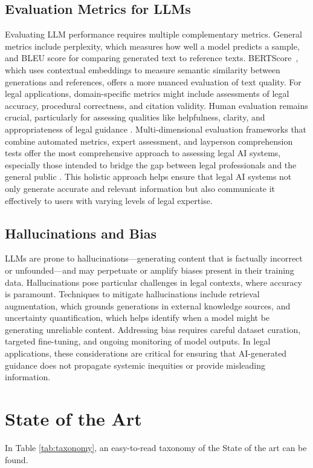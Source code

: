 \subsection{Evaluation Metrics for LLMs}
Evaluating LLM performance requires multiple complementary metrics. General metrics 
include perplexity, which measures how well a model predicts a sample, 
and BLEU score for comparing generated text to reference texts. 
BERTScore~\cite{zhang2020bertscoreevaluatingtextgeneration}, which uses contextual 
embeddings to measure semantic similarity between generations and references, 
offers a more nuanced evaluation of text quality. For legal applications, 
domain-specific metrics might include assessments of legal accuracy, 
procedural correctness, and citation validity. Human evaluation remains crucial, 
particularly for assessing qualities like helpfulness, clarity, and appropriateness 
of legal guidance \cite{guha2023legalbench, li2024experimentinglegalaisolutions}. 
Multi-dimensional evaluation frameworks that combine automated metrics, expert assessment, 
and layperson comprehension tests offer the most comprehensive approach to assessing legal AI systems, 
especially those intended to bridge the gap between legal professionals and the general public \cite{guo2023evaluating}. 
This holistic approach helps ensure that legal AI systems not only generate accurate and relevant 
information but also communicate it effectively to users with varying levels of legal expertise.
\subsection{Hallucinations and Bias}
LLMs are prone to hallucinations—generating content that is factually incorrect 
or unfounded—and may perpetuate or amplify biases present in their training data. 
Hallucinations pose particular challenges in legal contexts, where accuracy is 
paramount. Techniques to mitigate hallucinations include retrieval augmentation, 
which grounds generations in external knowledge sources, and uncertainty 
quantification, which helps identify when a model might be generating unreliable 
content. Addressing bias requires careful dataset curation, targeted fine-tuning, 
and ongoing monitoring of model outputs. In legal applications, these considerations 
are critical for ensuring that AI-generated guidance does not propagate systemic 
inequities or provide misleading information.

\section{State of the Art}
In Table \ref{tab:taxonomy}, an easy-to-read taxonomy of the State of the art can be found.

